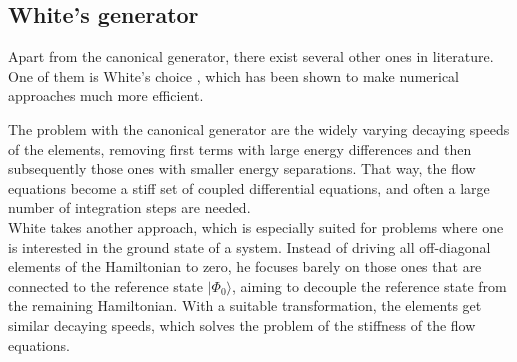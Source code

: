 
\subsection{White's generator}
\label{subsec:White}
Apart from the canonical generator, there exist several other ones in literature. One of them is White's choice \cite{White:cond-mat0201346}, which has been shown to make numerical approaches much more efficient. 

The problem with the canonical generator are the widely varying decaying speeds of the elements, removing first terms with large energy differences and then subsequently those ones with smaller energy separations.  That way, the flow equations become a stiff set of coupled differential equations, and often a large number of integration steps are needed.\\
White takes another approach, which is especially suited for problems where one is interested in the ground state of a system. Instead of driving all off-diagonal elements of the Hamiltonian to zero, he focuses barely on those ones that are connected to the reference state $|\Phi_0\rangle$, aiming to decouple the reference state from the remaining Hamiltonian. With a suitable transformation, the elements get similar decaying speeds, which solves the problem of the stiffness of the flow equations.

